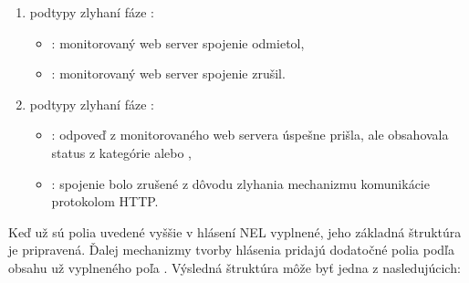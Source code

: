 \begin{itemize}
\begin{enumerate}
        \item podtypy zlyhaní fáze :
        \begin{itemize}
            \item {}: monitorovaný web server spojenie odmietol,
            \item {}: monitorovaný web server spojenie zrušil.
        \end{itemize}
        
        \item podtypy zlyhaní fáze :
        \begin{itemize}
            \item {}: odpoveď z monitorovaného web servera úspešne prišla, ale obsahovala status z kategórie  alebo ,
            
            \item {}: spojenie bolo zrušené z dôvodu zlyhania mechanizmu komunikácie protokolom HTTP. 
        \end{itemize}
    
    \end{enumerate}    
\end{itemize}

Keď už sú polia uvedené vyššie v hlásení NEL vyplnené, jeho základná štruktúra je pripravená.
Ďalej mechanizmy tvorby hlásenia pridajú dodatočné polia podľa obsahu už vyplneného poľa .
Výsledná štruktúra môže byť jedna z nasledujúcich: 

